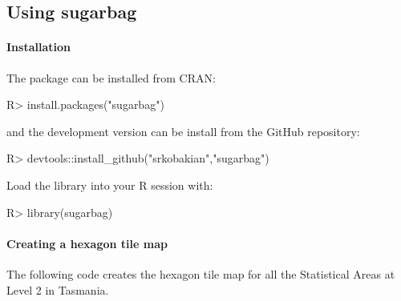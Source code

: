 \documentclass[
]{jss}
\begin{document}
\hypertarget{using-sugarbag}{%
\subsection{Using sugarbag}\label{using-sugarbag}}

\hypertarget{installation}{%
\paragraph{Installation}\label{installation}}

The package can be installed from CRAN:

\begin{CodeChunk}

\begin{CodeInput}
R> install.packages("sugarbag")
\end{CodeInput}
\end{CodeChunk}

and the development version can be install from the GitHub repository:

\begin{CodeChunk}

\begin{CodeInput}
R> devtools::install_github("srkobakian","sugarbag")
\end{CodeInput}
\end{CodeChunk}

Load the library into your R session with:

\begin{CodeChunk}

\begin{CodeInput}
R> library(sugarbag)
\end{CodeInput}
\end{CodeChunk}

\hypertarget{creating-a-hexagon-tile-map}{%
\paragraph{Creating a hexagon tile
map}\label{creating-a-hexagon-tile-map}}

The following code creates the hexagon tile map for all the Statistical
Areas at Level 2 in Tasmania.
\end{document}

